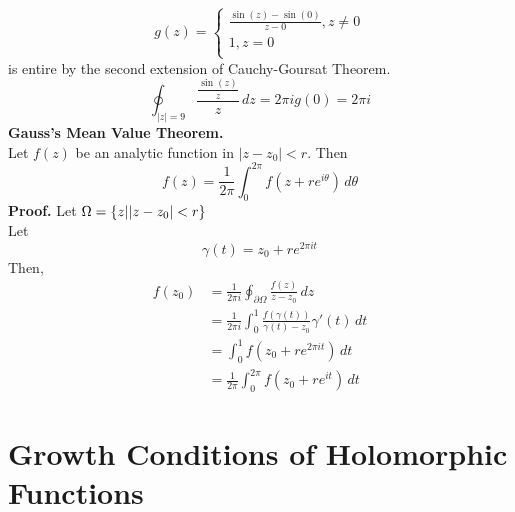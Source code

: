 \documentclass[11pt]{article}
\DeclarePairedDelimiter\abs{\lvert}{\rvert}
\begin{document}
\[ 
g(z) = 
\begin{cases} 
	\frac{\sin(z) - \sin(0)}{z - 0}, z \neq 0 \\
	1, z = 0\\
   \end{cases}
\]
is entire by the second extension of Cauchy-Goursat Theorem. 
$$\oint_{|z| = 9} \frac{\frac{\sin(z)}{z}}{z} \,dz = 2\pi i g(0) = 2\pi i$$
\newline
\textbf{Gauss's Mean Value Theorem.} \\
Let $f(z)$ be an analytic function in $|z - z_0| < r$. Then 
$$f(z) = \frac{1}{2\pi}\int_0^{2\pi} f(z + re^{i\theta}) \,d\theta$$ 
\textbf{Proof.} Let $\Omega = \{z|\abs{z - z_0} < r\}$ \\
Let 
$$\gamma(t) = z_0 + re^{2\pi i t}$$
Then, 
\begin{align*}
f(z_0) &= \frac{1}{2\pi i} \oint_{\partial \Omega} \frac{f(z)}{z - z_0} \,dz \\
&= \frac{1}{2\pi i }\int_0^1 \frac{f(\gamma(t))}{\gamma(t) - z_0} \gamma'(t) \, dt \\
&= \int_0^1 f(z_0 + re^{2\pi it}) \,dt \\ 
&= \frac{1}{2\pi}\int_0^{2\pi} f(z_0 + re^{it}) \,dt
\end{align*}

\newpage
\section{Growth Conditions of Holomorphic Functions}
\end{document}
